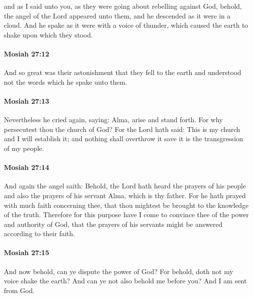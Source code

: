 			and as I said unto you,
			as they were going about rebelling against God,
			behold, the angel of the Lord appeared unto them,
			and he descended as it were in a cloud.
			And he spake as it were with a voice of thunder,
			which caused the earth to shake upon which they stood.

		\paragraph{Mosiah 27:12} %
			\label{MOSIAH-27-12}

			And so great was their astonishment that they fell to the earth
			and understood not the words which he spake unto them.

		\paragraph{Mosiah 27:13} %
			\label{MOSIAH-27-13}

			Nevertheless he cried again, saying:
			Alma, arise and stand forth.
			For why persecutest thou the church of God?
			For the Lord hath said:
			This is my church and I will establish it;
			and nothing shall overthrow it save it is the transgression of my people.

		\paragraph{Mosiah 27:14} %
			\label{MOSIAH-27-14}

			And again the angel saith:
			Behold, the Lord hath heard the prayers of his people
			and also the prayers of his servant Alma, which is thy father.
			For he hath prayed with much faith concerning thee,
			that thou mightest be brought to the knowledge of the truth.
			Therefore for this purpose have I come
			to convince thee of the power and authority of God,
			that the prayers of his servants might be answered according to their faith.

		\paragraph{Mosiah 27:15} %
			\label{MOSIAH-27-15}

			And now behold, can ye dispute the power of God?
			For behold, doth not my voice shake the earth?
			And can ye not also behold me before you?
			And I am sent from God.


